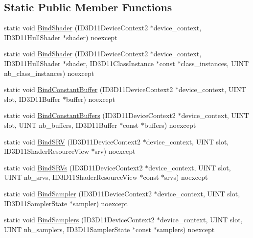 \subsection*{Static Public Member Functions}
\begin{DoxyCompactItemize}
\item 
static void \hyperlink{structmage_1_1_h_s_a653ed88c338aa3140f6ed376b49abf02}{Bind\+Shader} (I\+D3\+D11\+Device\+Context2 $\ast$device\+\_\+context, I\+D3\+D11\+Hull\+Shader $\ast$shader) noexcept
\item 
static void \hyperlink{structmage_1_1_h_s_a7050c8bbe5ec44c923eac59a0fd1273e}{Bind\+Shader} (I\+D3\+D11\+Device\+Context2 $\ast$device\+\_\+context, I\+D3\+D11\+Hull\+Shader $\ast$shader, I\+D3\+D11\+Class\+Instance $\ast$const $\ast$class\+\_\+instances, U\+I\+NT nb\+\_\+class\+\_\+instances) noexcept
\item 
static void \hyperlink{structmage_1_1_h_s_ada13c87288c4bc60a48e487ed01e4caa}{Bind\+Constant\+Buffer} (I\+D3\+D11\+Device\+Context2 $\ast$device\+\_\+context, U\+I\+NT slot, I\+D3\+D11\+Buffer $\ast$buffer) noexcept
\item 
static void \hyperlink{structmage_1_1_h_s_a98d42758ffcb5c11628be4c7c5f7b26c}{Bind\+Constant\+Buffers} (I\+D3\+D11\+Device\+Context2 $\ast$device\+\_\+context, U\+I\+NT slot, U\+I\+NT nb\+\_\+buffers, I\+D3\+D11\+Buffer $\ast$const $\ast$buffers) noexcept
\item 
static void \hyperlink{structmage_1_1_h_s_ab22e529fc9d6f95edea452f5b21defca}{Bind\+S\+RV} (I\+D3\+D11\+Device\+Context2 $\ast$device\+\_\+context, U\+I\+NT slot, I\+D3\+D11\+Shader\+Resource\+View $\ast$srv) noexcept
\item 
static void \hyperlink{structmage_1_1_h_s_afac6dbbdac96901720d30ffad0a10c28}{Bind\+S\+R\+Vs} (I\+D3\+D11\+Device\+Context2 $\ast$device\+\_\+context, U\+I\+NT slot, U\+I\+NT nb\+\_\+srvs, I\+D3\+D11\+Shader\+Resource\+View $\ast$const $\ast$srvs) noexcept
\item 
static void \hyperlink{structmage_1_1_h_s_a2d95a43a6e0c99afc2eba51cfabc3f7c}{Bind\+Sampler} (I\+D3\+D11\+Device\+Context2 $\ast$device\+\_\+context, U\+I\+NT slot, I\+D3\+D11\+Sampler\+State $\ast$sampler) noexcept
\item 
static void \hyperlink{structmage_1_1_h_s_aedeadb19e729068a0dec187066d48deb}{Bind\+Samplers} (I\+D3\+D11\+Device\+Context2 $\ast$device\+\_\+context, U\+I\+NT slot, U\+I\+NT nb\+\_\+samplers, I\+D3\+D11\+Sampler\+State $\ast$const $\ast$samplers) noexcept
\end{DoxyCompactItemize}
